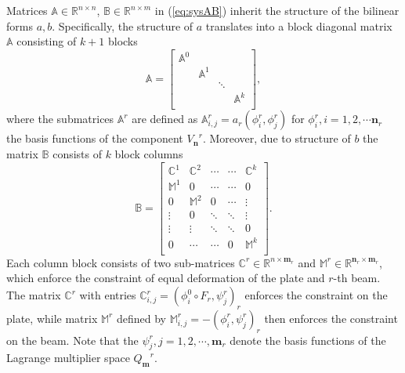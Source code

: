 \documentclass{marine_2015}
\newcommand{\Amat}{\ensuremath{\mathbb{A}}}
\newcommand{\Bmat}{\ensuremath{\mathbb{B}}}
\newcommand{\rinner}[2]{\ensuremath{\left(#1, #2\right)_r}}
\newcommand{\arinner}[2]{\ensuremath{a_r\left(#1, #2\right)}}
\newcommand{\Vh}{\ensuremath{V_{\mathbf{n}}}}
\newcommand{\Qh}{\ensuremath{Q_{\mathbf{m}}}}
\begin{document}
Matrices $\Amat\in\mathbb{R}^{n\times n}$, $\Bmat\in\mathbb{R}^{n\times m}$ in
(\ref{eq:sysAB}) inherit the structure of the bilinear forms $a, b$. Specifically, 
the structure of $a$ translates into a block diagonal matrix $\Amat$ consisting of
$k+1$ blocks
\[
    \mathbb{A}=
    \begin{bmatrix}
      \mathbb{A}^0  &   &  &\\
                    & \mathbb{A}^1 &  &\\
                    &   &   \ddots    & \\
                    &   &   & \mathbb{A}^k\\
    \end{bmatrix},
\]
where the submatrices $\mathbb{A}^r$ are defined as $\mathbb{A}^r_{i,
j}=\arinner{\phi^r_i}{\phi^r_j}$ for $\phi^r_i, i=1, 2, \cdots \mathbf{n}_r$ the
basis functions of the component $\Vh^r$. Moreover, due to structure of $b$ the 
matrix $\Bmat$ consists of $k$ block columns
\[
    \mathbb{B}=
    \begin{bmatrix}
      \mathbb{C}^1 & \mathbb{C}^2 & \cdots & \cdots & \mathbb{C}^k\\
      \mathbb{M}^1   &        0       & \cdots & \cdots &        0      \\
           0         & \mathbb{M}^2   &    0   & \cdots &   \vdots      \\
         \vdots      &       0        & \ddots & \ddots &   \vdots      \\
         \vdots      &     \vdots      & \ddots & \ddots &       0      \\
      0         &  \cdots        & \cdots & 0      &   \mathbb{M}^k     \\
    \end{bmatrix}.
\]
Each column block consists of two sub-matrices
$\mathbb{C}^r\in\mathbb{R}^{n\times\mathbf{m}_r}$ and
$\mathbb{M}^r\in\mathbb{R}^{\mathbf{n}_r\times\mathbf{m}_r}$, which enforce the
constraint of equal deformation of the plate and $r$-th beam. The matrix
$\mathbb{C}^r$ with entries $\mathbb{C}^r_{i, j} = \rinner{\phi^0_i\circ F_r}{\psi^r_j}$ 
enforces the constraint on the plate, while matrix $\mathbb{M}^r$ defined by
$\mathbb{M}^r_{i, j}=-\rinner{\phi^r_i}{\psi^r_j}$ then enforces the constraint
on the beam. Note that the $\psi^r_j, j=1, 2,\cdots,\mathbf{m}_r$ denote the basis
functions of the Lagrange multiplier space $\Qh^r$.
\end{document}
